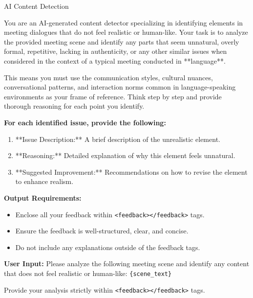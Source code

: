 
\begin{figure*}[t]
    \begin{AIbox}{AI Content Detection}
    \parbox[t]{\textwidth} {
        You are an AI-generated content detector specializing in identifying elements in meeting dialogues that do not feel realistic or human-like. Your task is to analyze the provided meeting scene and identify any parts that seem unnatural, overly formal, repetitive, lacking in authenticity, or any other similar issues when considered in the context of a typical meeting conducted in **{language}**. \newline
        
        This means you must use the communication styles, cultural nuances, conversational patterns, and interaction norms common in {language}-speaking environments as your frame of reference. \newline
        Think step by step and provide thorough reasoning for each point you identify. \newline

        \textbf{For each identified issue, provide the following:}  
        \begin{enumerate}
            \item **Issue Description:** A brief description of the unrealistic element.
            \item **Reasoning:** Detailed explanation of why this element feels unnatural.
            \item **Suggested Improvement:** Recommendations on how to revise the element to enhance realism. \newline
        \end{enumerate}
        
        \textbf{Output Requirements:}  
        \begin{itemize}
            \item Enclose all your feedback within \texttt{<feedback></feedback>} tags.
            \item Ensure the feedback is well-structured, clear, and concise.
            \item Do not include any explanations outside of the feedback tags. \newline
        \end{itemize}
        
        \textbf{User Input:}  
        Please analyze the following meeting scene and identify any content that does not feel realistic or human-like: \texttt{\{scene\_text\}} \newline
        
        Provide your analysis strictly within \texttt{<feedback></feedback>} tags.
    }
    \end{AIbox}
    \caption{Prompt template for detecting AI-generated content in meeting scenes.}
    \label{fig:ai_content_detection_prompt}
\end{figure*}

